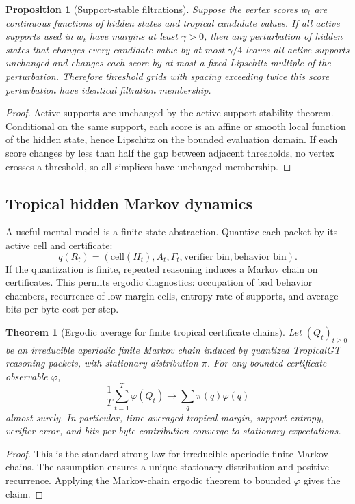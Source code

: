 \documentclass[11pt]{article}
\newtheorem{theorem}[definition]{Theorem}
\newtheorem{proposition}[definition]{Proposition}
\begin{document}
\begin{proposition}[Support-stable filtrations]
Suppose the vertex scores \(w_t\) are continuous functions of hidden states and tropical candidate values.  If all active supports used in \(w_t\) have margins at least \(\gamma>0\), then any perturbation of hidden states that changes every candidate value by at most \(\gamma/4\) leaves all active supports unchanged and changes each score by at most a fixed Lipschitz multiple of the perturbation.  Therefore threshold grids with spacing exceeding twice this score perturbation have identical filtration membership.
\end{proposition}
\begin{proof}
Active supports are unchanged by the active support stability theorem.  Conditional on the same support, each score is an affine or smooth local function of the hidden state, hence Lipschitz on the bounded evaluation domain.  If each score changes by less than half the gap between adjacent thresholds, no vertex crosses a threshold, so all simplices have unchanged membership.
\end{proof}

\subsection{Tropical hidden Markov dynamics}

A useful mental model is a finite-state abstraction.  Quantize each packet by its active cell and certificate:
\begin{equation}
q(R_t)=(\text{cell}(H_t), A_t, \Gamma_t, \text{verifier bin}, \text{behavior bin}).
\end{equation}
If the quantization is finite, repeated reasoning induces a Markov chain on certificates.  This permits ergodic diagnostics: occupation of bad behavior chambers, recurrence of low-margin cells, entropy rate of supports, and average bits-per-byte cost per step.

\begin{theorem}[Ergodic average for finite tropical certificate chains]
Let \((Q_t)_{t\ge0}\) be an irreducible aperiodic finite Markov chain induced by quantized TropicalGT reasoning packets, with stationary distribution \(\pi\).  For any bounded certificate observable \(\varphi\),
\begin{equation}
\frac1T\sum_{t=1}^T \varphi(Q_t)\to \sum_q \pi(q)\varphi(q)
\end{equation}
almost surely.  In particular, time-averaged tropical margin, support entropy, verifier error, and bits-per-byte contribution converge to stationary expectations.
\end{theorem}
\begin{proof}
This is the standard strong law for irreducible aperiodic finite Markov chains.  The assumption ensures a unique stationary distribution and positive recurrence.  Applying the Markov-chain ergodic theorem to bounded \(\varphi\) gives the claim.
\end{proof}
\end{document}
